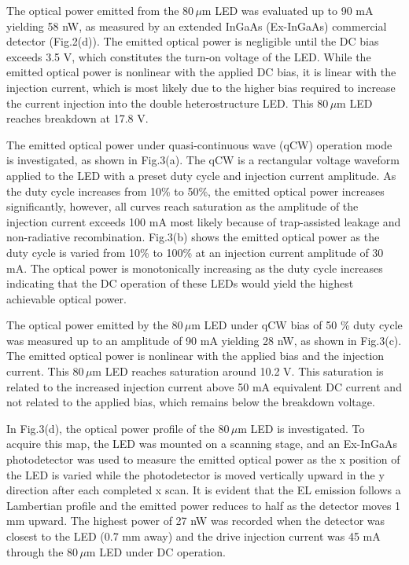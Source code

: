 The optical power emitted from the $80\,\mu$m LED was evaluated up to 90 mA yielding 58 nW, as measured by an extended InGaAs (Ex-InGaAs) commercial detector (Fig.2(d)). The emitted optical power is negligible until the DC bias exceeds 3.5 V, which constitutes the turn-on voltage of the LED. While the emitted optical power is nonlinear with the applied DC bias, it is linear with the injection current, which is most likely due to the higher bias required to increase the current injection into the double heterostructure LED. This $80\,\mu$m LED reaches breakdown at 17.8 V. 

The emitted optical power under quasi-continuous wave (qCW) operation mode is investigated, as shown in Fig.3(a).  The qCW is a rectangular voltage waveform applied to the LED with a preset duty cycle and injection current amplitude. As the duty cycle increases from 10\% to 50\%, the emitted optical power increases significantly, however, all curves reach saturation as the amplitude of the injection current exceeds 100 mA most likely because of trap-assisted leakage and non-radiative recombination. Fig.3(b)  shows the emitted optical power as the duty cycle is varied from 10\% to 100\% at an injection current amplitude of 30 mA. The optical power is monotonically increasing as the duty cycle increases indicating that the DC operation of these LEDs would yield the highest achievable optical power. 

The optical power emitted by the $80\,\mu$m LED under qCW bias of 50 \% duty cycle was measured up to an amplitude of 90 mA yielding 28 nW, as shown in Fig.3(c). The emitted optical power is nonlinear with the applied bias and the injection current. This $80\,\mu$m LED reaches saturation around 10.2 V. This saturation is related to the increased injection current above 50 mA equivalent DC current and not related to the applied bias, which remains below the breakdown voltage. 


\bigskip

In Fig.3(d), the optical power profile of the $80\,\mu$m LED is investigated. To acquire this map, the LED was mounted on a scanning stage, and an Ex-InGaAs photodetector was used to measure the emitted optical power as the x position of the LED is varied while the photodetector is moved vertically upward in the y direction after each completed x scan. It is evident that the EL emission follows a Lambertian profile and the emitted power reduces to half as the detector moves 1 mm upward. The highest power of 27 nW was recorded when the detector was closest to the LED (0.7 mm away) and the drive injection current was 45 mA through the $80\,\mu$m LED under DC operation. 

